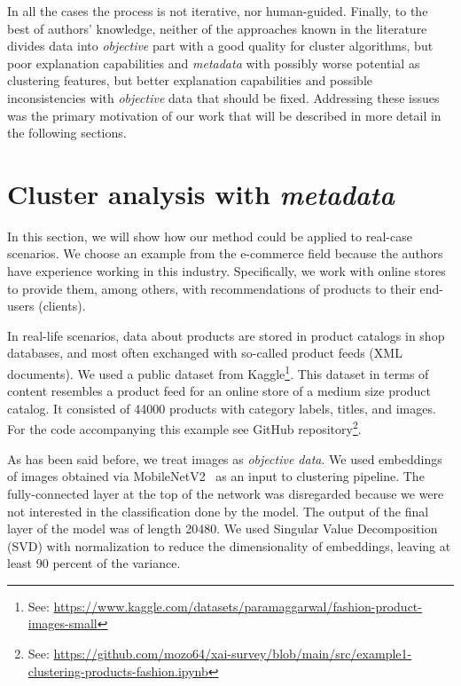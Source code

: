 \documentclass[
 twocolumn,
 hf,
]{ceurart}
\begin{document}
In all the cases the process is not iterative, nor human-guided.
Finally, to the best of authors' knowledge, neither of the approaches known in the literature divides data into \textit{objective} part with a good quality for cluster algorithms, but poor explanation capabilities and \textit{metadata} with possibly worse potential as clustering features, but better explanation capabilities and possible inconsistencies with \textit{objective} data that should be fixed.
Addressing these issues was the primary motivation of our work that will be described in more detail in the following sections.

\section{Cluster analysis with \textit{metadata}}
\label{sec:clumeta}
In this section, we will show how our method could be applied to real-case scenarios.
We choose an example from the e-commerce field because the authors have experience working in this industry.
Specifically, we work with online stores to provide them, among others, with recommendations of products to their end-users (clients).

In real-life scenarios, data about products are stored in product catalogs in shop databases, and most often exchanged with so-called product feeds (XML documents).
We used a public dataset from Kaggle\footnote{See: \url{https://www.kaggle.com/datasets/paramaggarwal/fashion-product-images-small}}.
This dataset in terms of content resembles a product feed for an online store of a medium size product catalog.
It consisted of 44000 products with category labels, titles, and images.
For the code accompanying this example see GitHub repository\footnote{See: \url{https://github.com/mozo64/xai-survey/blob/main/src/example1-clustering-products-fashion.ipynb}}.

As has been said before, we treat images as \textit{objective data}.
We used embeddings of images obtained via MobileNetV2~\cite{sandler2019mobilenetv2} as an input to clustering pipeline.
The fully-connected layer at the top of the network was disregarded because we were not interested in the classification done by the model.
The output of the final layer of the model was of length 20480.
We used Singular Value Decomposition (SVD) with normalization to reduce the dimensionality of embeddings, leaving at least 90 percent of the variance.
\end{document}
